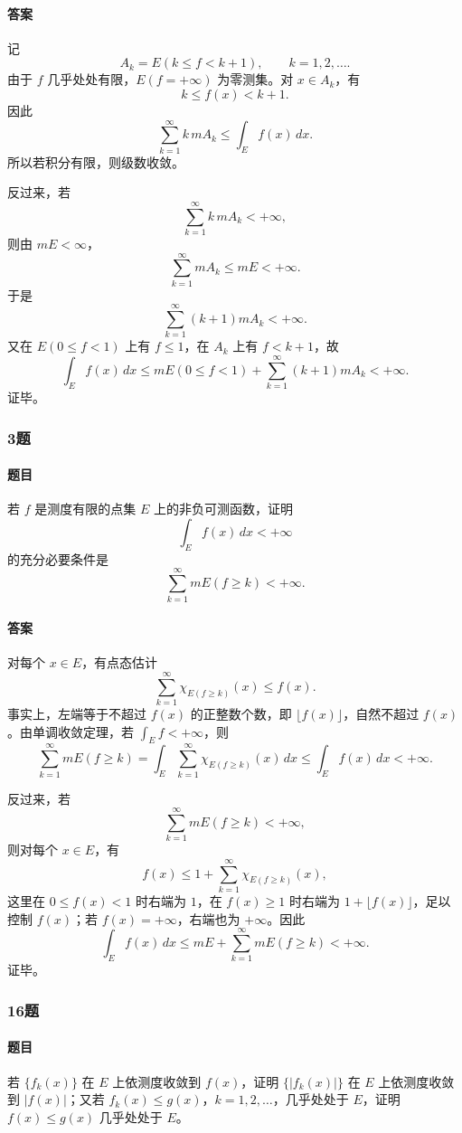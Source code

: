 \documentclass{article}
\begin{document}
\paragraph{答案} 记
\[
 A_k=E(k\le f<k+1),\qquad k=1,2,\ldots.
\]
由于 $f$ 几乎处处有限，$E(f=+\infty)$ 为零测集。对 $x\in A_k$，有
\[
 k\le f(x)<k+1.
\]
因此
\[
 \sum_{k=1}^{\infty} k\,mA_k
\le \int_E f(x)\,dx.
\]
所以若积分有限，则级数收敛。

反过来，若
\[
 \sum_{k=1}^{\infty} k\,mA_k<+\infty,
\]
则由 $mE<\infty$，
\[
 \sum_{k=1}^{\infty}mA_k\le mE<+\infty.
\]
于是
\[
 \sum_{k=1}^{\infty}(k+1)mA_k<+\infty.
\]
又在 $E(0\le f<1)$ 上有 $f\le1$，在 $A_k$ 上有 $f<k+1$，故
\[
 \int_E f(x)\,dx
\le mE(0\le f<1)+\sum_{k=1}^{\infty}(k+1)mA_k<+\infty.
\]
证毕。

\subsubsection*{3题}
\paragraph{题目} 若 $f$ 是测度有限的点集 $E$ 上的非负可测函数，证明
\[
 \int_E f(x)\,dx<+\infty
\]
的充分必要条件是
\[
 \sum_{k=1}^{\infty}mE(f\ge k)<+\infty.
\]

\paragraph{答案} 对每个 $x\in E$，有点态估计
\[
 \sum_{k=1}^{\infty}\chi_{E(f\ge k)}(x)\le f(x).
\]
事实上，左端等于不超过 $f(x)$ 的正整数个数，即 $\lfloor f(x)\rfloor$，自然不超过 $f(x)$。由单调收敛定理，若 $\int_E f<+\infty$，则
\[
 \sum_{k=1}^{\infty}mE(f\ge k)
=\int_E\sum_{k=1}^{\infty}\chi_{E(f\ge k)}(x)\,dx
\le \int_E f(x)\,dx<+\infty.
\]

反过来，若
\[
 \sum_{k=1}^{\infty}mE(f\ge k)<+\infty,
\]
则对每个 $x\in E$，有
\[
 f(x)\le 1+\sum_{k=1}^{\infty}\chi_{E(f\ge k)}(x),
\]
这里在 $0\le f(x)<1$ 时右端为 $1$，在 $f(x)\ge1$ 时右端为 $1+\lfloor f(x)\rfloor$，足以控制 $f(x)$；若 $f(x)=+\infty$，右端也为 $+\infty$。因此
\[
 \int_E f(x)\,dx
\le mE+\sum_{k=1}^{\infty}mE(f\ge k)<+\infty.
\]
证毕。

\subsubsection*{16题}
\paragraph{题目} 若 $\{f_k(x)\}$ 在 $E$ 上依测度收敛到 $f(x)$，证明 $\{|f_k(x)|\}$ 在 $E$ 上依测度收敛到 $|f(x)|$；又若 $f_k(x)\le g(x)$，$k=1,2,\ldots$，几乎处处于 $E$，证明 $f(x)\le g(x)$ 几乎处处于 $E$。
\end{document}
